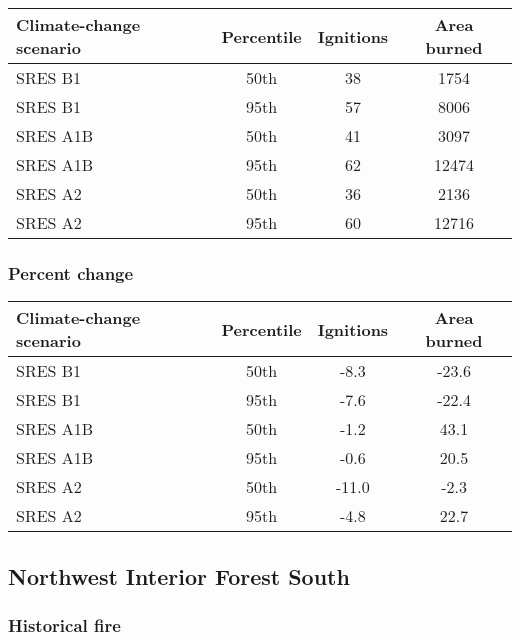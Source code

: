 \documentclass{article}\usepackage[]{graphicx}\usepackage[]{color}
\newcommand{\headcol}{\rowcolor{tableheadcolor}}
\begin{document}
\begin{table}[ht]
\centering
\begin{tabular}{lccc}
  \headcol 
 \toprule
Climate-change scenario & Percentile & Ignitions & Area burned \\ 
  \midrule
SRES B1 & 50th & 38 & 1754 \\ 
  SRES B1 & 95th & 57 & 8006 \\ 
  SRES A1B & 50th & 41 & 3097 \\ 
  SRES A1B & 95th & 62 & 12474 \\ 
  SRES A2 & 50th & 36 & 2136 \\ 
  SRES A2 & 95th & 60 & 12716 \\ 
   \bottomrule
\end{tabular}
\end{table}


\subsubsection{Percent change}

\begin{table}[ht]
\centering
\begin{tabular}{lccc}
  \headcol 
 \toprule
Climate-change scenario & Percentile & Ignitions & Area burned \\ 
  \midrule
SRES B1 & 50th & -8.3 & -23.6 \\ 
  SRES B1 & 95th & -7.6 & -22.4 \\ 
  SRES A1B & 50th & -1.2 & 43.1 \\ 
  SRES A1B & 95th & -0.6 & 20.5 \\ 
  SRES A2 & 50th & -11.0 & -2.3 \\ 
  SRES A2 & 95th & -4.8 & 22.7 \\ 
   \bottomrule
\end{tabular}
\end{table}


\newpage
\subsection{Northwest Interior Forest South}
\subsubsection{Historical fire}
\end{document}
